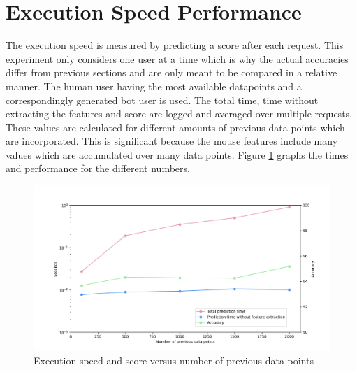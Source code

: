 \documentclass[
    fontsize=12pt,
    headings=small,
    parskip=half,           %
    bibliography=totoc,
    numbers=noenddot,       %
    open=any,               %
    final,                   %
    table
]{scrreprt}
\begin{document}


\section{Execution Speed Performance}

The execution speed is measured by predicting a score after each request. This experiment only considers one user at a time which is why the actual accuracies differ from previous sections and are only meant to be compared in a relative manner. The human user having the most available datapoints and a correspondingly generated bot user is used. The total time, time without extracting the features and score are logged and averaged over multiple requests. These values are calculated for different amounts of previous data points which are incorporated. This is significant because the mouse features include many values which are accumulated over many data points. Figure \ref{fig:speed_per_dp_count} graphs the times and performance for the different numbers.

\begin{figure}[H]
    \includegraphics[width=\textwidth]{figures/speed_per_dp_count.png}
    \caption{Execution speed and score versus number of previous data points}
    \label{fig:speed_per_dp_count}
\end{figure}
\end{document}

